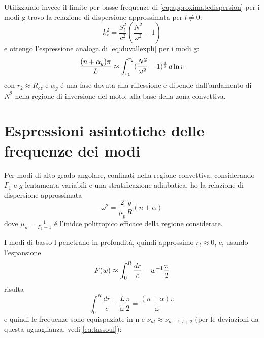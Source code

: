 \documentclass[../main.tex]{subfiles}
\begin{document}
Utilizzando invece il limite per basse frequenze di \eqref{eq:approximatedispersion} per i modi g trovo la relazione di dispersione approssimata per $l\neq0$:
\begin{equation}
k_r^2=\frac{S_l^2}{c^2}(\frac{N^2}{\omega^2}-1)\label{eq:dispersionag}
\end{equation}
e ottengo l'espressione analoga di \eqref{eq:duvallexpli} per i modi g:
\begin{equation}\label{eq:duvallg}
\frac{(n+\alpha_g)\pi}{L}\approx\int_{r_1}^{r_2}(\frac{N^2}{\omega^2}-1)^{\frac{1}{2}}\,d\ln{r}
\end{equation}
con $r_2\approx R_{cz}$ e $\alpha_g$ \'e una fase dovuta alla riflessione e dipende dall'andamento di $N^2$ nella regione di inversione del moto, alla base della zona convettiva.

\section{Espressioni asintotiche delle frequenze dei modi}


Per modi di alto grado angolare, confinati nella regione convettiva, considerando $\Gamma_1$ e $g$ lentamenta variabili e una stratificazione adiabatica, ho la relazione di dispersione approssimata
\begin{equation}
\omega^2=\frac{2}{\mu_p}\frac{g}{R}(n+\alpha)
\end{equation}
dove $\mu_p=\frac{1}{\Gamma_1-1}$ \'e l'inidce politropico efficace della regione considerate. 

I modi di basso l penetrano in profondit\'a, quindi approssimo $r_t\approx0$, e, usando l'espansione
\begin{equation}
F(w)\approx\int_0^R\frac{dr}{c}-w^{-1}\frac{\pi}{2}\label{eq:Flinear}
\end{equation}
 risulta
\begin{equation}
\int_0^R\frac{dr}{c}-\frac{L}{\omega}\frac{\pi}{2}=\frac{(n+\alpha)\pi}{\omega}
\end{equation}
e quindi le  frequenze sono equispaziate in n e $\nu_{nl}\approx\nu_{n-1,l+2}$ (per le deviazioni da questa uguaglianza, vedi \eqref{eq:tassoul}):
\end{document}
